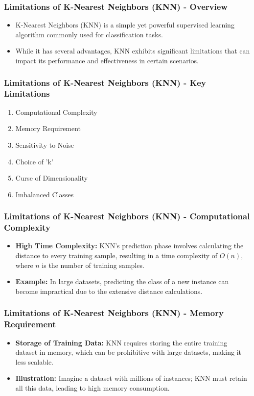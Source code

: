 \documentclass[aspectratio=169]{beamer}
\begin{document}
\begin{frame}[fragile]
    \frametitle{Limitations of K-Nearest Neighbors (KNN) - Overview}
    \begin{itemize}
        \item K-Nearest Neighbors (KNN) is a simple yet powerful supervised learning algorithm commonly used for classification tasks.
        \item While it has several advantages, KNN exhibits significant limitations that can impact its performance and effectiveness in certain scenarios.
    \end{itemize}
\end{frame}

\begin{frame}[fragile]
    \frametitle{Limitations of K-Nearest Neighbors (KNN) - Key Limitations}
    \begin{enumerate}
        \item Computational Complexity
        \item Memory Requirement
        \item Sensitivity to Noise
        \item Choice of 'k'
        \item Curse of Dimensionality
        \item Imbalanced Classes
    \end{enumerate}
\end{frame}

\begin{frame}[fragile]
    \frametitle{Limitations of K-Nearest Neighbors (KNN) - Computational Complexity}
    \begin{itemize}
        \item \textbf{High Time Complexity:} KNN's prediction phase involves calculating the distance to every training sample, resulting in a time complexity of $O(n)$, where $n$ is the number of training samples.
        \item \textbf{Example:} In large datasets, predicting the class of a new instance can become impractical due to the extensive distance calculations.
    \end{itemize}
\end{frame}

\begin{frame}[fragile]
    \frametitle{Limitations of K-Nearest Neighbors (KNN) - Memory Requirement}
    \begin{itemize}
        \item \textbf{Storage of Training Data:} KNN requires storing the entire training dataset in memory, which can be prohibitive with large datasets, making it less scalable.
        \item \textbf{Illustration:} Imagine a dataset with millions of instances; KNN must retain all this data, leading to high memory consumption.
    \end{itemize}
\end{frame}
\end{document}
